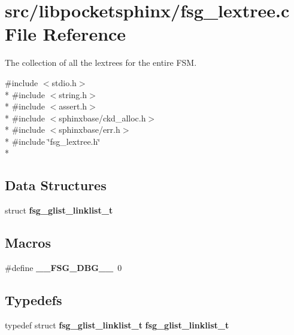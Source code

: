 \section{src/libpocketsphinx/fsg\+\_\+lextree.c File Reference}
\label{fsg__lextree_8c}


The collection of all the lextrees for the entire F\+S\+M.  


{\ttfamily \#include $<$stdio.\+h$>$}\\*
{\ttfamily \#include $<$string.\+h$>$}\\*
{\ttfamily \#include $<$assert.\+h$>$}\\*
{\ttfamily \#include $<$sphinxbase/ckd\+\_\+alloc.\+h$>$}\\*
{\ttfamily \#include $<$sphinxbase/err.\+h$>$}\\*
{\ttfamily \#include \char`\"{}fsg\+\_\+lextree.\+h\char`\"{}}\\*
\subsection*{Data Structures}
\begin{DoxyCompactItemize}
\item 
struct {\bf fsg\+\_\+glist\+\_\+linklist\+\_\+t}
\end{DoxyCompactItemize}
\subsection*{Macros}
\begin{DoxyCompactItemize}
\item 
\#define {\bfseries \+\_\+\+\_\+\+F\+S\+G\+\_\+\+D\+B\+G\+\_\+\+\_\+}~0\label{fsg__lextree_8c_a7acaaaaea00ab148fa241f7ce86cab14}

\end{DoxyCompactItemize}
\subsection*{Typedefs}
\begin{DoxyCompactItemize}
\item 
typedef struct {\bf fsg\+\_\+glist\+\_\+linklist\+\_\+t} {\bfseries fsg\+\_\+glist\+\_\+linklist\+\_\+t}\label{fsg__lextree_8c_a0ed5b76987ef1e416b40a06a9d80902f}

\end{DoxyCompactItemize}
